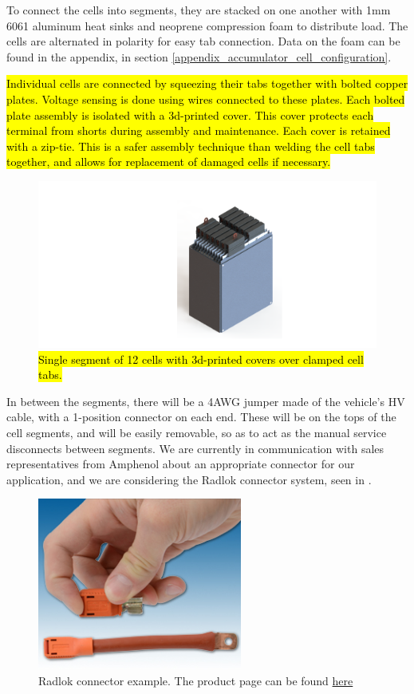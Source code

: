 \documentclass{article}
\begin{document}
To connect the cells into segments, they are stacked on one another with 1mm 6061 aluminum heat sinks and neoprene compression foam to distribute load. The cells are alternated in polarity for easy tab connection. Data on the foam can be found in the appendix, in section \ref{appendix_accumulator_cell_configuration}.

\hl{Individual cells are connected by squeezing their tabs together with bolted copper plates. Voltage sensing is done using wires connected to these plates. Each bolted plate assembly is isolated with a 3d-printed cover. This cover protects each terminal from shorts during assembly and maintenance. Each cover is retained with a zip-tie. This is a safer assembly technique than welding the cell tabs together, and allows for replacement of damaged cells if necessary.} 

\begin{figure}[H]
\centering
\includegraphics[width=1\textwidth]{module_iso_method_2}
\caption{\hl{Single segment of 12 cells with 3d-printed covers over clamped cell tabs.}}
\label{fig:cell_tabs}
\end{figure}

In between the segments, there will be a 4AWG jumper made of the vehicle's HV cable, with a 1-position connector on each end. These will be on the tops of the cell segments, and will be easily removable, so as to act as the manual service disconnects between segments. We are currently in communication with sales representatives from Amphenol about an appropriate connector for our application, and we are considering the Radlok connector system, seen in .

\begin{figure}[H]
\centering
\includegraphics[width=0.6\textwidth]{RADLOK-main.jpg}
\caption{Radlok connector example. The product page can be found \href{http://www.amphenol-industrial.com/radlok}{here}}
\label{fig:radlok}
\end{figure}
\end{document}
